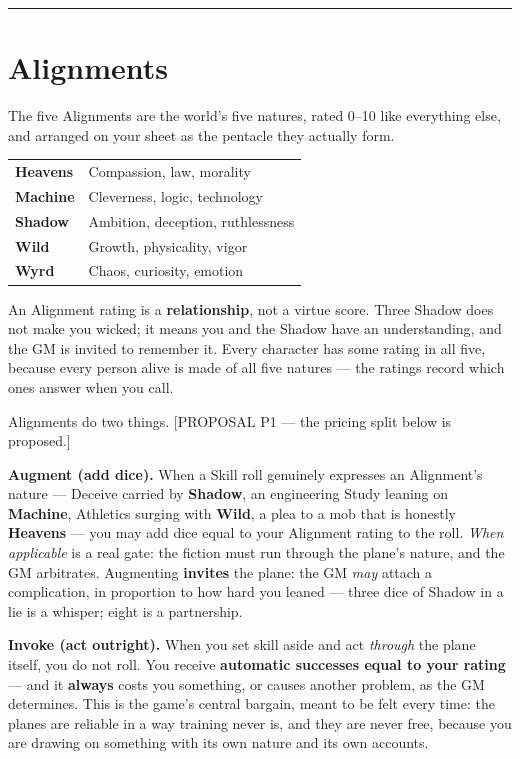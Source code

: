 \medskip\hrule\medskip

\section{Alignments}

The five Alignments are the world's five natures, rated 0--10 like everything else, and arranged on your sheet as the pentacle they actually form.

\begin{center}
\begin{tabular}{ll}
\textbf{Heavens} & Compassion, law, morality \\
\textbf{Machine} & Cleverness, logic, technology \\
\textbf{Shadow} & Ambition, deception, ruthlessness \\
\textbf{Wild} & Growth, physicality, vigor \\
\textbf{Wyrd} & Chaos, curiosity, emotion \\
\end{tabular}
\end{center}

An Alignment rating is a \textbf{relationship}, not a virtue score. Three Shadow does not make you wicked; it means you and the Shadow have an understanding, and the GM is invited to remember it. Every character has some rating in all five, because every person alive is made of all five natures --- the ratings record which ones answer when you call.

Alignments do two things. [PROPOSAL P1 --- the pricing split below is proposed.]

\textbf{Augment (add dice).} When a Skill roll genuinely expresses an Alignment's nature --- Deceive carried by \textbf{Shadow}, an engineering Study leaning on \textbf{Machine}, Athletics surging with \textbf{Wild}, a plea to a mob that is honestly \textbf{Heavens} --- you may add dice equal to your Alignment rating to the roll. \textit{When applicable} is a real gate: the fiction must run through the plane's nature, and the GM arbitrates. Augmenting \textbf{invites} the plane: the GM \textit{may} attach a complication, in proportion to how hard you leaned --- three dice of Shadow in a lie is a whisper; eight is a partnership.

\textbf{Invoke (act outright).} When you set skill aside and act \textit{through} the plane itself, you do not roll. You receive \textbf{automatic successes equal to your rating} --- and it \textbf{always} costs you something, or causes another problem, as the GM determines. This is the game's central bargain, meant to be felt every time: the planes are reliable in a way training never is, and they are never free, because you are drawing on something with its own nature and its own accounts.

